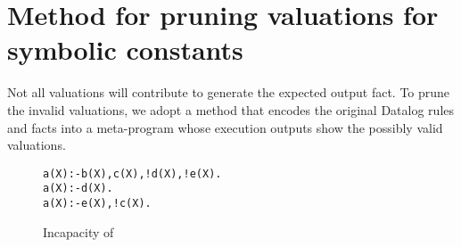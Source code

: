 \documentclass[acmsmall,screen,review,anonymous,nonacm]{acmart}
\begin{document}


\begin{comment}
For instance, given two Datalog rules \lstinline[mathescape]`L$_{0}$ :- L$_{1}$,...,L$_{k-1}$,L$_{k}$,L$_{k+1}$,...,L$_{n}$ (denoted as R$_1$)` and \lstinline[mathescape]`L$_{0}$ :- L$_{1}$,...,L$_{k-1}$,L$_{k+1}$,...,L$_{n}$ (denoted as R$_2$)`,
to produce the same output fact of \lstinline[mathescape]`L$_{0}$`, 
rule \lstinline[mathescape]`R$_1$` requires one more input fact of \lstinline[mathescape]`L$_{k}$ ` compared with \lstinline[mathescape]`R$_2$`.
Therefore, $\Datalog^{+}$ can produce more constants than $\Datalog$ with the same input facts, and thereby there are more constants for \code{\alpha} to unify in $\Datalog^+$.
\end{comment}


\section{Method for pruning valuations for symbolic constants}
\label{sec:prune}

Not all valuations will contribute to generate the expected output fact.
To prune the invalid valuations, we adopt a method that encodes the original Datalog rules and facts into a meta-program whose execution outputs show the possibly valid valuations.

\begin{figure}[!h]
\vspace{-1mm}
\begin{lstlisting}[xleftmargin=5em,numbers=none,basicstyle=\footnotesize\ttfamily]
a(X):-b(X),c(X),!d(X),!e(X).
a(X):-d(X).
a(X):-e(X),!c(X).
\end{lstlisting} 
\vspace{-2mm}
\caption{Incapacity of \Symlog}
\label{fig:symbolic_sign_Example}
\vspace{-2mm}
\end{figure}
\end{document}
